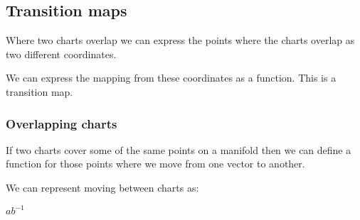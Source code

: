 
\subsection{Transition maps}

Where two charts overlap we can express the points where the charts overlap as two different coordinates.

We can express the mapping from these coordinates as a function. This is a transition map.

\subsubsection{Overlapping charts}

If two charts cover some of the same points on a manifold then we can define a function for those points where we move from one vector to another.

We can represent moving between charts as:

\(ab^{-1}\)


